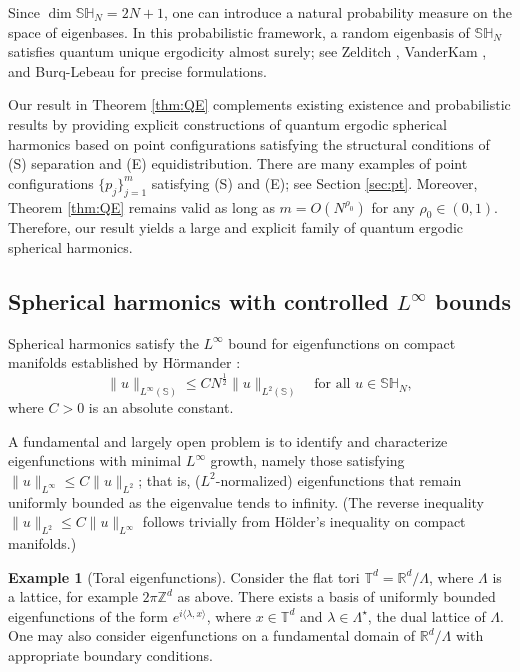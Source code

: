 \documentclass[12pt,reqno]{amsart}
\newcommand{\R}{\mathbb{R}}
\newcommand{\Sb}{\mathbb{S}}
\newcommand{\SH}{\mathbb{SH}}
\newcommand{\T}{\mathbb{T}}
\newcommand{\Z}{\mathbb{Z}}
\theoremstyle{plain}
\theoremstyle{definition}
\newtheorem*{ex}{Example}
\theoremstyle{remark}
\numberwithin{equation}{section}
\begin{document}
Since $\dim\SH_N=2N+1$, one can introduce a natural probability measure on the space of eigenbases. In this probabilistic framework, a random eigenbasis of $\SH_N$ satisfies quantum unique ergodicity almost surely; see Zelditch \cite{Ze2}, VanderKam \cite{V}, and Burq-Lebeau \cite{BuLe} for precise formulations.

Our result in Theorem \ref{thm:QE} complements existing existence and probabilistic results by providing explicit constructions of quantum ergodic spherical harmonics based on point configurations satisfying the structural conditions of (S) separation and (E) equidistribution. There are many examples of point configurations $\{p_j\}_{j=1}^m$ satisfying (S) and (E); see Section \ref{sec:pt}. Moreover, Theorem \ref{thm:QE} remains valid as long as $m = O(N^{\rho_0})$ for any $\rho_0 \in (0,1)$. Therefore, our result yields a large and explicit family of quantum ergodic spherical harmonics.

\subsection{Spherical harmonics with controlled $L^\infty$ bounds}
Spherical harmonics satisfy the $L^\infty$ bound for eigenfunctions on compact manifolds established by H\"ormander \cite{Ho}:
\begin{equation}\label{eq:Linfty}
\|u\|_{L^\infty(\Sb)}\le CN^{\frac12}\|u\|_{L^2(\Sb)}\quad\text{for all }u\in\SH_N,
\end{equation} 
where $C>0$ is an absolute constant.

A fundamental and largely open problem is to identify and characterize eigenfunctions with minimal $L^\infty$ growth, namely those satisfying $\|u\|_{L^\infty}\le C\|u\|_{L^2}$; that is, ($L^2$-normalized) eigenfunctions that remain uniformly bounded as the eigenvalue tends to infinity. (The reverse inequality $\|u\|_{L^2}\le C\|u\|_{L^\infty}$ follows trivially from H\"older’s inequality on compact manifolds.)

\begin{ex}[Toral eigenfunctions]
Consider the flat tori $\T^d=\R^d/\Lambda$, where $\Lambda$ is a lattice, for example $2\pi\Z^d$ as above. There exists a basis of uniformly bounded eigenfunctions of the form $e^{i\langle\lambda,x\rangle}$, where $x\in\T^d$ and $\lambda\in\Lambda^\star$, the dual lattice of $\Lambda$. One may also consider eigenfunctions on a fundamental domain of $\R^d/\Lambda$ with appropriate boundary conditions.
\end{ex}
\end{document}
